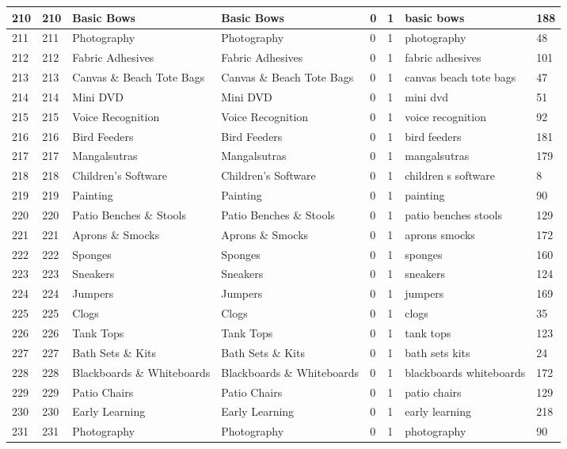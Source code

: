 \begin{longtable}{|l|l|l|l|l|l|l|l|}
210 & 210 & Basic Bows & Basic Bows & 0 & 1 & basic bows & 188 \\ \hline 
211 & 211 & Photography & Photography & 0 & 1 & photography & 48 \\ \hline 
212 & 212 & Fabric Adhesives & Fabric Adhesives & 0 & 1 & fabric adhesives & 101 \\ \hline 
213 & 213 & Canvas \& Beach Tote Bags & Canvas \& Beach Tote Bags & 0 & 1 & canvas beach tote bags & 47 \\ \hline 
214 & 214 & Mini DVD & Mini DVD & 0 & 1 & mini dvd & 51 \\ \hline 
215 & 215 & Voice Recognition & Voice Recognition & 0 & 1 & voice recognition & 92 \\ \hline 
216 & 216 & Bird Feeders & Bird Feeders & 0 & 1 & bird feeders & 181 \\ \hline 
217 & 217 & Mangalsutras & Mangalsutras & 0 & 1 & mangalsutras & 179 \\ \hline 
218 & 218 & Children's Software & Children's Software & 0 & 1 & children s software & 8 \\ \hline 
219 & 219 & Painting & Painting & 0 & 1 & painting & 90 \\ \hline 
220 & 220 & Patio Benches \& Stools & Patio Benches \& Stools & 0 & 1 & patio benches stools & 129 \\ \hline 
221 & 221 & Aprons \& Smocks & Aprons \& Smocks & 0 & 1 & aprons smocks & 172 \\ \hline 
222 & 222 & Sponges & Sponges & 0 & 1 & sponges & 160 \\ \hline 
223 & 223 & Sneakers & Sneakers & 0 & 1 & sneakers & 124 \\ \hline 
224 & 224 & Jumpers & Jumpers & 0 & 1 & jumpers & 169 \\ \hline 
225 & 225 & Clogs & Clogs & 0 & 1 & clogs & 35 \\ \hline 
226 & 226 & Tank Tops & Tank Tops & 0 & 1 & tank tops & 123 \\ \hline 
227 & 227 & Bath Sets \& Kits & Bath Sets \& Kits & 0 & 1 & bath sets kits & 24 \\ \hline 
228 & 228 & Blackboards \& Whiteboards & Blackboards \& Whiteboards & 0 & 1 & blackboards whiteboards & 172 \\ \hline 
229 & 229 & Patio Chairs & Patio Chairs & 0 & 1 & patio chairs & 129 \\ \hline 
230 & 230 & Early Learning & Early Learning & 0 & 1 & early learning & 218 \\ \hline 
231 & 231 & Photography & Photography & 0 & 1 & photography & 90 \\ \hline 

\end{longtable}

